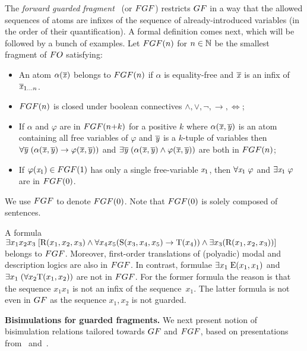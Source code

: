 The \emph{forward guarded fragment}~\cite[Sec. 3.1]{Bednarczyk21} (or $\FGF$) restricts $\GF$ in a way that the allowed sequences of atoms are infixes of the sequence of already-introduced variables (in the order of their quantification).
A formal definition comes next, which will be followed by a bunch of examples.
Let $\FGF(n)$ for $n \in {\mathbb{N}}$ be the smallest fragment of $\FO$ satisfying:
\begin{itemize}\itemsep0em
    \item An atom $\alpha(\overline{\mathit{x}})$ belongs to $\FGF(n)$ if $\alpha$ is equality-free and $\overline{\mathit{x}}$ is an infix of $\overline{\mathit{x}}_{1\ldots n}$.
    \item $\FGF(n)$ is closed under boolean connectives $\land, \lor, \neg, \to, \iff$;
    \item If $\alpha$ and $\varphi$ are in $\FGF(n{+}k)$ for a positive $k$ where $\alpha(\overline{\mathit{x}}, \overline{\mathit{y}})$ is an atom containing all free variables of $\varphi$ and $\overline{\mathit{y}}$ is a $k$-tuple of variables then $\forall{\overline{\mathit{y}}} \; (\alpha(\overline{\mathit{x}}, \overline{\mathit{y}}) \to \varphi(\overline{\mathit{x}}, \overline{\mathit{y}}))$ and $\exists{\overline{\mathit{y}}} \; (\alpha(\overline{\mathit{x}}, \overline{\mathit{y}}) \land \varphi(\overline{\mathit{x}}, \overline{\mathit{y}}))$ are both in $\FGF(n)$;
    \item If $\varphi(\varx_1) \in \FGF(1)$ has only a single free-variable $\mathit{x}_1$, then $\forall{\mathit{x}_1}\; \varphi$ and $\exists{\mathit{x}_1}\; \varphi$ are in $\FGF(0)$.
\end{itemize}
We use $\FGF$ to denote $\FGF(0)$. Note that $\FGF(0)$ is solely composed of sentences. 

\begin{example}
A formula $\exists{x_1x_{2}x_{3}}\; [\mathrm{R}(x_{1}, x_{2}, x_{3}) \land \forall{x_{4}x_{5}}(\mathrm{S}(x_{3}, x_{4}, x_{5}) \to \mathrm{T}(x_{4})) \land \exists{x_{3}}(\mathrm{R}(x_{1}, x_{2}, x_{3}))]$ belongs to $\FGF$.
Moreover, first-order translations of (polyadic) modal and description logics are also in $\FGF$.
In contrast, formulae $\exists{x_{1}}\; \mathrm{E}(x_{1}, x_{1})$ and $\exists{x_{1}}\; (\forall{x_{2}} \mathrm{T}(x_{1}, x_{2}))$ are not in $\FGF$.
For the former formula the reason is that the sequence $x_1x_1$ is not an infix of the sequence~$x_1$.
The latter formula is not even in $\GF$ as the sequence $x_{1}, x_{2}$ is not guarded.
\end{example}

\noindent \textbf{Bisimulations for guarded fragments.}
%
We next present notion of bisimulation relations tailored towards $\GF$ and $\FGF$, based on presentations from~\cite[Sec. 2.2.3]{Otto04} and~\cite[Sec. 2]{BednarczykJ22}.

